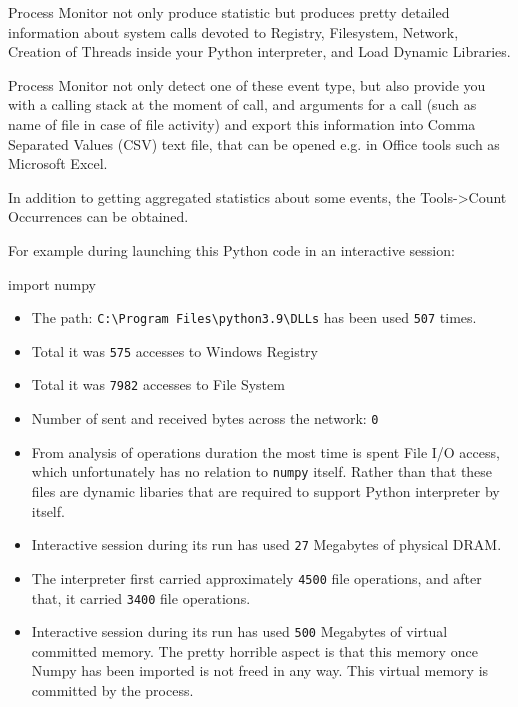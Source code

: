 \documentclass[
]{article}
\newenvironment{Shaded}{}{}
\newcommand{\ImportTok}[1]{#1}
\newcommand{\NormalTok}[1]{#1}
\begin{document}
Process Monitor not only produce statistic but produces pretty detailed
information about system calls devoted to Registry, Filesystem, Network,
Creation of Threads inside your Python interpreter, and Load Dynamic
Libraries.

Process Monitor not only detect one of these event type, but also
provide you with a calling stack at the moment of call, and arguments
for a call (such as name of file in case of file activity) and export
this information into Comma Separated Values (CSV) text file, that can
be opened e.g. in Office tools such as Microsoft Excel.

In addition to getting aggregated statistics about some events, the
Tools-\textgreater Count Occurrences can be obtained.

For example during launching this Python code in an interactive session:

\begin{Shaded}
\begin{Highlighting}[]
\ImportTok{import}\NormalTok{ numpy}
\end{Highlighting}
\end{Shaded}

\begin{itemize}
\item
  The path:
  \texttt{C:\textbackslash{}Program\ Files\textbackslash{}python3.9\textbackslash{}DLLs}
  has been used \texttt{507} times.
\item
  Total it was \texttt{575} accesses to Windows Registry
\item
  Total it was \texttt{7982} accesses to File System
\item
  Number of sent and received bytes across the network: \texttt{0}
\item
  From analysis of operations duration the most time is spent File I/O
  access, which unfortunately has no relation to \texttt{numpy} itself.
  Rather than that these files are dynamic libaries that are required to
  support Python interpreter by itself.
\item
  Interactive session during its run has used \texttt{27} Megabytes of
  physical DRAM.
\item
  The interpreter first carried approximately \texttt{4500} file
  operations, and after that, it carried \texttt{3400} file operations.
\item
  Interactive session during its run has used \texttt{500} Megabytes of
  virtual committed memory. The pretty horrible aspect is that this
  memory once Numpy has been imported is not freed in any way. This
  virtual memory is committed by the process.
\end{itemize}
\end{document}
